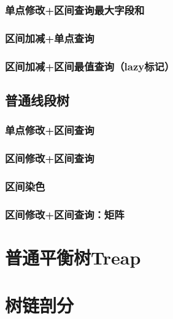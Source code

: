 \documentclass{article}
\begin{document}
\subsubsection{单点修改+区间查询最大字段和}

\subsubsection{区间加减+单点查询}

\subsubsection{区间加减+区间最值查询（lazy标记）}

\subsection{普通线段树}
\subsubsection{单点修改+区间查询}

\subsubsection{区间修改+区间查询}

\subsubsection{区间染色}

\subsubsection{区间修改+区间查询：矩阵}



\section{普通平衡树Treap}


\section{树链剖分}

\end{document}
